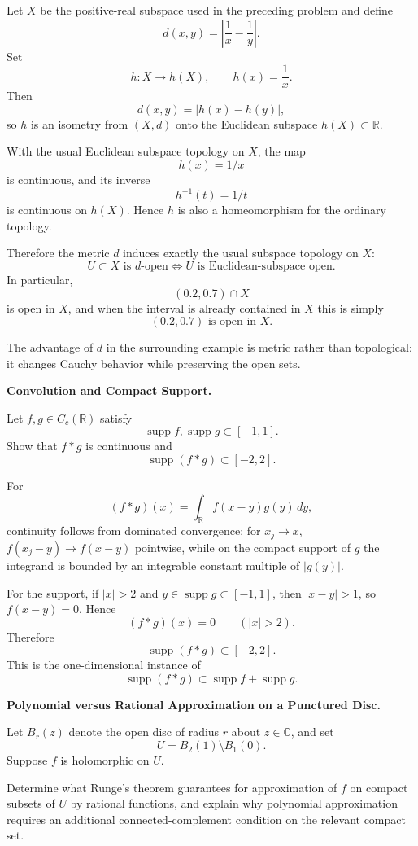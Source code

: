 \begin{solution}
Let \(X\) be the positive-real subspace used in the preceding problem and define
\[
d(x,y)
=
\left|
\frac1x-\frac1y
\right|.
\]
Set
\[
h:X\to h(X),
\qquad
h(x)=\frac1x.
\]
Then
\[
d(x,y)=|h(x)-h(y)|,
\]
so \(h\) is an isometry from \((X,d)\) onto the Euclidean subspace \(h(X)\subset\mathbb R\).

With the usual Euclidean subspace topology on \(X\), the map
\[
h(x)=1/x
\]
is continuous, and its inverse
\[
h^{-1}(t)=1/t
\]
is continuous on \(h(X)\). Hence \(h\) is also a homeomorphism for the ordinary topology.

Therefore the metric \(d\) induces exactly the usual subspace topology on \(X\):
\[
\boxed{
U\subset X\text{ is }d\text{-open}
\iff
U\text{ is Euclidean-subspace open}.
}
\]
In particular,
\[
(0.2,0.7)\cap X
\]
is open in \(X\), and when the interval is already contained in \(X\) this is simply
\[
\boxed{(0.2,0.7)\text{ is open in }X.}
\]

The advantage of \(d\) in the surrounding example is metric rather than topological: it changes Cauchy behavior while preserving the open sets.
\end{solution}


\begin{problem}[CP-II-0367]
\label{prob:cp-ii-0367}
\textbf{Convolution and Compact Support.}

\hspace*{1.5em}Let \(f,g\in C_c(\mathbb R)\) satisfy
\[
\operatorname{supp}f,\operatorname{supp}g\subset[-1,1].
\]
Show that \(f*g\) is continuous and
\[
\operatorname{supp}(f*g)\subset[-2,2].
\]
\end{problem}

\begin{solution}
For
\[
(f*g)(x)=\int_{\mathbb R}f(x-y)g(y)\,dy,
\]
continuity follows from dominated convergence: for \(x_j\to x\),
\(f(x_j-y)\to f(x-y)\) pointwise, while on the compact support of \(g\) the
integrand is bounded by an integrable constant multiple of \(|g(y)|\).

For the support, if \(|x|>2\) and \(y\in\operatorname{supp}g\subset[-1,1]\),
then \(|x-y|>1\), so \(f(x-y)=0\). Hence
\[
(f*g)(x)=0\qquad(|x|>2).
\]
Therefore
\[
\boxed{\operatorname{supp}(f*g)\subset[-2,2].}
\]
This is the one-dimensional instance of
\[
\operatorname{supp}(f*g)\subset
\operatorname{supp}f+\operatorname{supp}g.
\]
\end{solution}


\begin{problem}[CP-II-0372]
\label{prob:cp-ii-0372}
\textbf{Polynomial versus Rational Approximation on a Punctured Disc.}

\hspace*{1.5em}Let \(B_r(z)\) denote the open disc of radius \(r\) about \(z\in\mathbb C\), and set
\[
U=B_2(1)\setminus B_1(0).
\]
Suppose \(f\) is holomorphic on \(U\).

Determine what Runge's theorem guarantees for approximation of \(f\) on compact
subsets of \(U\) by rational functions, and explain why polynomial approximation
requires an additional connected-complement condition on the relevant compact set.
\end{problem}

